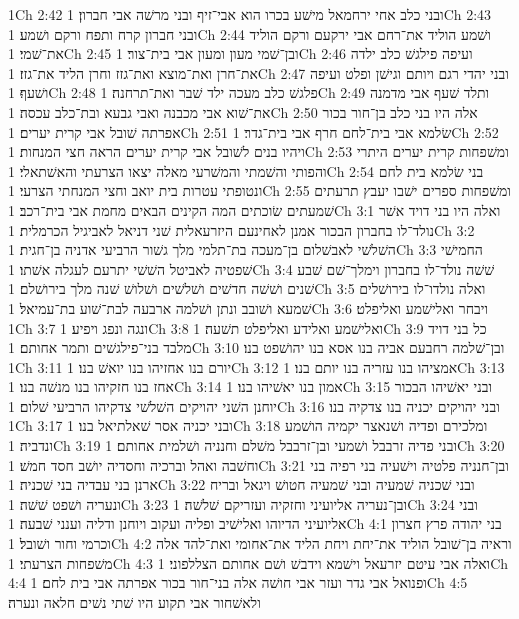 1Ch 2:42  ובני כלב אחי ירחמאל מישׁע בכרו הוא אבי־זיף ובני מרשׁה אבי חברון׃
1Ch 2:43  ובני חברון קרח ותפח ורקם ושׁמע׃
1Ch 2:44  ושׁמע הוליד את־רחם אבי ירקעם ורקם הוליד את־שׁמי׃
1Ch 2:45  ובן־שׁמי מעון ומעון אבי בית־צור׃
1Ch 2:46  ועיפה פילגשׁ כלב ילדה את־חרן ואת־מוצא ואת־גזז וחרן הליד את־גזז׃
1Ch 2:47  ובני יהדי רגם ויותם וגישׁן ופלט ועיפה ושׁעף׃
1Ch 2:48  פלגשׁ כלב מעכה ילד שׁבר ואת־תרחנה׃
1Ch 2:49  ותלד שׁעף אבי מדמנה את־שׁוא אבי מכבנה ואבי גבעא ובת־כלב עכסה׃
1Ch 2:50  אלה היו בני כלב בן־חור בכור אפרתה שׁובל אבי קרית יערים׃
1Ch 2:51  שׂלמא אבי בית־לחם חרף אבי בית־גדר׃
1Ch 2:52  ויהיו בנים לשׁובל אבי קרית יערים הראה חצי המנחות׃
1Ch 2:53  ומשׁפחות קרית יערים היתרי והפותי והשׁמתי והמשׁרעי מאלה יצאו הצרעתי והאשׁתאלי׃
1Ch 2:54  בני שׂלמא בית לחם ונטופתי עטרות בית יואב וחצי המנחתי הצרעי׃
1Ch 2:55  ומשׁפחות ספרים ישׁבו יעבץ תרעתים שׁמעתים שׂוכתים המה הקינים הבאים מחמת אבי בית־רכב׃
1Ch 3:1  ואלה היו בני דויד אשׁר נולד־לו בחברון הבכור אמנן לאחינעם היזרעאלית שׁני דניאל לאביגיל הכרמלית׃
1Ch 3:2  השׁלשׁי לאבשׁלום בן־מעכה בת־תלמי מלך גשׁור הרביעי אדניה בן־חגית׃
1Ch 3:3  החמישׁי שׁפטיה לאביטל השׁשׁי יתרעם לעגלה אשׁתו׃
1Ch 3:4  שׁשׁה נולד־לו בחברון וימלך־שׁם שׁבע שׁנים ושׁשׁה חדשׁים ושׁלשׁים ושׁלושׁ שׁנה מלך בירושׁלם׃
1Ch 3:5  ואלה נולדו־לו בירושׁלים שׁמעא ושׁובב ונתן ושׁלמה ארבעה לבת־שׁוע בת־עמיאל׃
1Ch 3:6  ויבחר ואלישׁמע ואליפלט׃
1Ch 3:7  ונגה ונפג ויפיע׃
1Ch 3:8  ואלישׁמע ואלידע ואליפלט תשׁעה׃
1Ch 3:9  כל בני דויד מלבד בני־פילגשׁים ותמר אחותם׃
1Ch 3:10  ובן־שׁלמה רחבעם אביה בנו אסא בנו יהושׁפט בנו׃
1Ch 3:11  יורם בנו אחזיהו בנו יואשׁ בנו׃
1Ch 3:12  אמציהו בנו עזריה בנו יותם בנו׃
1Ch 3:13  אחז בנו חזקיהו בנו מנשׁה בנו׃
1Ch 3:14  אמון בנו יאשׁיהו בנו׃
1Ch 3:15  ובני יאשׁיהו הבכור יוחנן השׁני יהויקים השׁלשׁי צדקיהו הרביעי שׁלום׃
1Ch 3:16  ובני יהויקים יכניה בנו צדקיה בנו׃
1Ch 3:17  ובני יכניה אסר שׁאלתיאל בנו׃
1Ch 3:18  ומלכירם ופדיה ושׁנאצר יקמיה הושׁמע ונדביה׃
1Ch 3:19  ובני פדיה זרבבל ושׁמעי ובן־זרבבל משׁלם וחנניה ושׁלמית אחותם׃
1Ch 3:20  וחשׁבה ואהל וברכיה וחסדיה יושׁב חסד חמשׁ׃
1Ch 3:21  ובן־חנניה פלטיה וישׁעיה בני רפיה בני ארנן בני עבדיה בני שׁכניה׃
1Ch 3:22  ובני שׁכניה שׁמעיה ובני שׁמעיה חטושׁ ויגאל ובריח ונעריה ושׁפט שׁשׁה׃
1Ch 3:23  ובן־נעריה אליועיני וחזקיה ועזריקם שׁלשׁה׃
1Ch 3:24  ובני אליועיני הדיוהו ואלישׁיב ופליה ועקוב ויוחנן ודליה וענני שׁבעה׃
1Ch 4:1  בני יהודה פרץ חצרון וכרמי וחור ושׁובל׃
1Ch 4:2  וראיה בן־שׁובל הוליד את־יחת ויחת הליד את־אחומי ואת־להד אלה משׁפחות הצרעתי׃
1Ch 4:3  ואלה אבי עיטם יזרעאל וישׁמא וידבשׁ ושׁם אחותם הצללפוני׃
1Ch 4:4  ופנואל אבי גדר ועזר אבי חושׁה אלה בני־חור בכור אפרתה אבי בית לחם׃
1Ch 4:5  ולאשׁחור אבי תקוע היו שׁתי נשׁים חלאה ונערה׃
